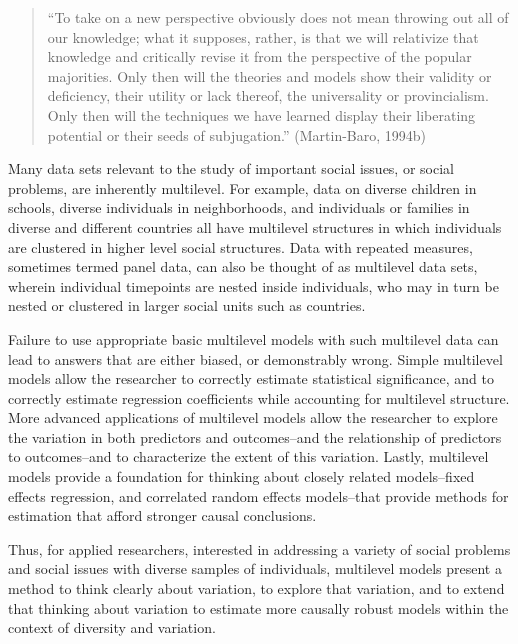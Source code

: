 \documentclass[
  letterpaper,
  DIV=11,
  numbers=noendperiod]{scrreprt}
\begin{document}
\begin{quote}
``To take on a new perspective obviously does not mean throwing out all
of our knowledge; what it supposes, rather, is that we will relativize
that knowledge and critically revise it from the perspective of the
popular majorities. Only then will the theories and models show their
validity or deficiency, their utility or lack thereof, the universality
or provincialism. Only then will the techniques we have learned display
their liberating potential or their seeds of subjugation.''
(Martin-Baro, 1994b) 
\end{quote}

Many data sets relevant to the study of important social issues, or
social problems, are inherently multilevel. For example, data on diverse
children in schools, diverse individuals in neighborhoods, and
individuals or families in diverse and different countries all have
multilevel structures in which individuals are clustered in higher level
social structures. Data with repeated measures, sometimes termed panel
data, can also be thought of as multilevel data sets, wherein individual
timepoints are nested inside individuals, who may in turn be nested or
clustered in larger social units such as countries.

Failure to use appropriate basic multilevel models with such multilevel
data can lead to answers that are either biased, or demonstrably wrong.
Simple multilevel models allow the researcher to correctly estimate
statistical significance, and to correctly estimate regression
coefficients while accounting for multilevel structure.
 More advanced applications of multilevel models
allow the researcher to explore the variation in both predictors and
outcomes--and the relationship of predictors to outcomes--and to
characterize the extent of this variation. Lastly, multilevel models
provide a foundation for thinking about closely related models--fixed
effects regression, and correlated random effects models--that provide
methods for estimation that afford stronger causal conclusions.

Thus, for applied researchers, interested in addressing a variety of
social problems and social issues with diverse samples of individuals,
multilevel models present a method to think clearly about variation, to
explore that variation, and to extend that thinking about variation to
estimate more causally robust models within the context of diversity and
variation. 
\end{document}
